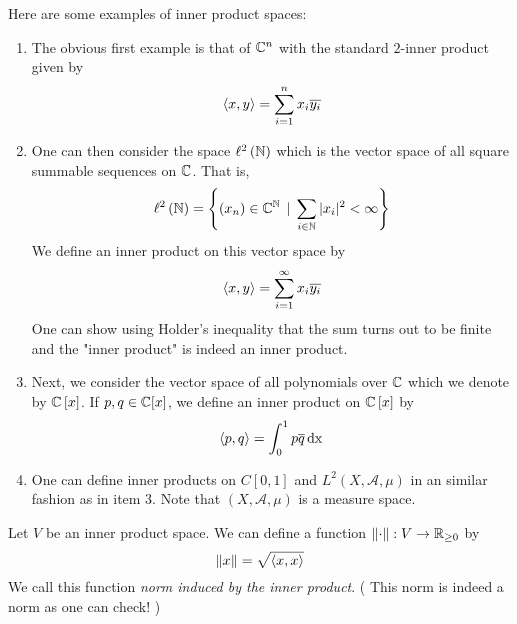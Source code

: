 \begin{example}
    Here are some examples of inner product spaces:
    \begin{enumerate}
	\item The obvious first example is that of $\mathbb C ^{n}$ with the standard $2$-inner product given by
	    \begin{equation*}
		\left\langle x,y \right\rangle = \sum_{i=1}^{n} x_{i} \overline{y_{i}}
	    \end{equation*}

	\item One can then consider the space $\ell ^{2} \left( \mathbb N \right)$ which is the vector space of all square summable sequences on $\mathbb C$. That is,
	    \begin{equation*}
		\ell^{2} \left( \mathbb N \right) = \left\{ \left( x_{n} \right) \in \mathbb C ^{\mathbb N} \, \mid \, \sum_{i\in \mathbb N} |x_i|^{2} < \infty \right\} \end{equation*}
We define an inner product on this vector space by 
 \begin{equation*}
		\left\langle x,y \right\rangle = \sum_{i=1}^{\infty} x_{i} \overline{y_{i}}
	    \end{equation*}
	    One can show using Holder's inequality that the sum turns out to be finite and the "inner product" is indeed an inner product.
	\item Next, we consider the vector space of all polynomials over $\mathbb C$ which we denote by $\mathbb C \left[ x \right]$. If $p , q \in \mathbb C [x]$, we define an inner product on $\mathbb C \left[ x \right]$ by 
	    \begin{equation*}
		\left\langle p,q \right\rangle = \int_{0}^{1} p\overline q \, \mathrm{dx}
	    \end{equation*}
	\item One can define inner products on $C[0,1]$ and $L^{2} (X, \mathscr A , \mu)$ in an similar fashion as in item 3. Note that $\left( X, \mathscr A, \mu \right)$ is a measure space.
    \end{enumerate}
\end{example}

\begin{definition}
    Let $V$ be an inner product space. We can define a function $\left\lVert \cdot \right\rVert : V \to \mathbb R _{\ge 0}$ by
    \begin{equation*}
	\left\lVert x \right\rVert = \sqrt{\left\langle x,x \right\rangle}
    \end{equation*}
    We call this function \textit{norm induced by the inner product}. ( This norm is indeed a norm as one can check! )
    \label{def:norm-induced-by-ip}
\end{definition}

